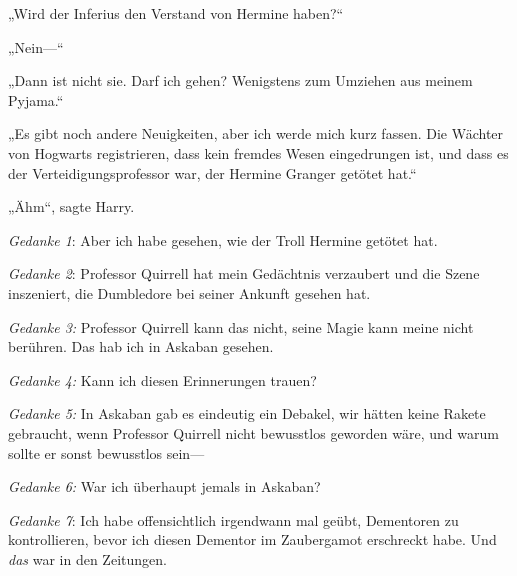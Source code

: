„Wird der Inferius den Verstand von Hermine haben?“

„Nein—“

„Dann ist nicht sie. Darf ich gehen? Wenigstens zum Umziehen aus meinem Pyjama.“

„Es gibt noch andere Neuigkeiten, aber ich werde mich kurz fassen. Die Wächter von Hogwarts registrieren, dass kein fremdes Wesen eingedrungen ist, und dass es der Verteidigungsprofessor war, der Hermine Granger getötet hat.“

„Ähm“, sagte Harry.

\emph{Gedanke 1}: Aber ich habe gesehen, wie der Troll Hermine getötet hat.

\emph{Gedanke 2}: Professor Quirrell hat mein Gedächtnis verzaubert und die Szene inszeniert, die Dumbledore bei seiner Ankunft gesehen hat.

\emph{Gedanke 3:} Professor Quirrell kann das nicht, seine Magie kann meine nicht berühren. Das hab ich in Askaban gesehen.

\emph{Gedanke 4:} Kann ich diesen Erinnerungen trauen?

\emph{Gedanke 5:} In Askaban gab es eindeutig ein Debakel, wir hätten keine Rakete gebraucht, wenn Professor Quirrell nicht bewusstlos geworden wäre, und warum sollte er sonst bewusstlos sein—

\emph{Gedanke 6:} War ich überhaupt jemals in Askaban?

\emph{Gedanke 7}: Ich habe offensichtlich irgendwann mal geübt, Dementoren zu kontrollieren, bevor ich diesen Dementor im Zaubergamot erschreckt habe. Und \emph{das} war in den Zeitungen.

